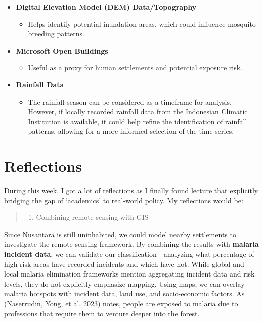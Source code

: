 \documentclass[
  letterpaper,
  DIV=11,
  numbers=noendperiod]{scrreprt}
\providecommand{\tightlist}{%
  \setlength{\itemsep}{0pt}\setlength{\parskip}{0pt}}\usepackage{longtable,booktabs,array}
\begin{document}
\begin{itemize}
\item
  \textbf{Digital Elevation Model (DEM) Data/Topography}

  \begin{itemize}
  \tightlist
  \item
    Helps identify potential inundation areas, which could influence
    mosquito breeding patterns.
  \end{itemize}
\item
  \textbf{Microsoft Open Buildings}

  \begin{itemize}
  \tightlist
  \item
    Useful as a proxy for human settlements and potential exposure risk.
  \end{itemize}
\item
  \textbf{Rainfall Data}

  \begin{itemize}
  \tightlist
  \item
    The rainfall season can be considered as a timeframe for analysis.
    However, if locally recorded rainfall data from the Indonesian
    Climatic Institution is available, it could help refine the
    identification of rainfall patterns, allowing for a more informed
    selection of the time series.
  \end{itemize}
\end{itemize}

\hypertarget{reflections-2}{%
\section{Reflections}\label{reflections-2}}

During this week, I got a lot of reflections as I finally found lecture
that explicitly bridging the gap of `academics' to real-world policy. My
reflections would be:

\begin{quote}
\begin{enumerate}
\def\labelenumi{\arabic{enumi}.}
\tightlist
\item
  Combining remote sensing with GIS
\end{enumerate}
\end{quote}

Since Nusantara is still uninhabited, we could model nearby settlements
to investigate the remote sensing framework. By combining the results
with \textbf{malaria incident data}, we can validate our
classification---analyzing what percentage of high-risk areas have
recorded incidents and which have not. While global and local malaria
elimination frameworks mention aggregating incident data and risk
levels, they do not explicitly emphasize mapping. Using maps, we can
overlay malaria hotspots with incident data, land use, and
socio-economic factors. As (Naserrudin, Yong, et al. 2023) notes, people
are exposed to malaria due to professions that require them to venture
deeper into the forest.
\end{document}
